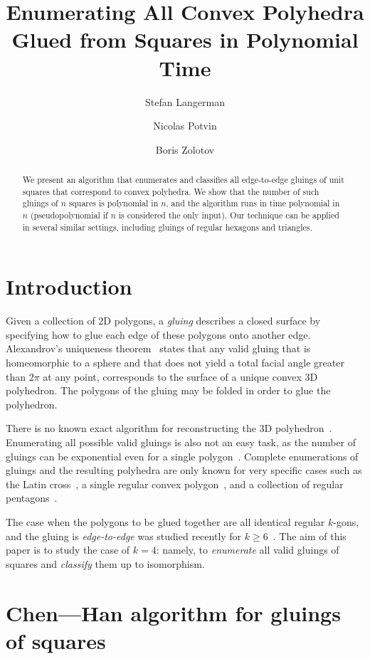 \documentclass[a4paper,USenglish,cleveref, autoref, thm-restate]{socg-lipics-v2019}
\title{Enumerating All Convex Polyhedra Glued from Squares in Polynomial Time}
\author{Stefan Langerman}{Faculté des Sciences, Université Libre de Bruxelles}{stefan.langerman@ulb.ac.be}{ }{is Directeur de recherches du F.R.S.-FNRS}
\author{Nicolas Potvin}{Faculté des Sciences, Université Libre de Bruxelles}{potvinnicolas2@gmail.com}{ }{}
\author{Boris Zolotov}{Department of Mathematics and Computer Sciences, St. Petersburg State University}{boris.a.zolotov@yandex.com}{ }{is supported in part by the Foundation for the Advancement of Theoretical Physics and Mathematics ``BASIS'' and in part by ``Native towns'', a social investment program of PJSC ``Gazprom Neft''.}
\begin{document}
\maketitle

\begin{abstract}We present an algorithm that enumerates and classifies all edge-to-edge gluings of unit squares that correspond to convex polyhedra. We show that the number of such gluings of $n$ squares is polynomial in $n$, and the algorithm runs in time polynomial in $n$ (pseudopolynomial if $n$ is considered the only input). Our technique can be applied in several similar settings, including gluings of regular hexagons and triangles.\end{abstract}

\section{Introduction}

Given a collection of 2D polygons, a \emph{gluing} describes a closed surface by specifying how to glue each edge of these polygons onto another edge. Alexandrov's uniqueness theorem~\cite{alex} states that any valid gluing that is homeomorphic to a sphere and that does not yield a total facial angle greater than $2\pi$ at any point, corresponds to the surface of a unique convex 3D polyhedron. The polygons of the gluing may be folded in order to glue the polyhedron.

There is no known exact algorithm for reconstructing the 3D polyhedron~\cite{bannister2014galois,kpd09-approx}. Enumerating all possible valid gluings is also not an easy task, as the number of gluings can be exponential even for a single polygon~\cite{DDLO02}. Complete enumerations of gluings and the resulting polyhedra are only known for very specific cases such as the Latin cross~\cite{ddlop99}, a single regular convex polygon~\cite{DO07}, and a collection of regular pentagons~\cite{alz-penta}.

The case when the polygons to be glued together are all identical regular $k$-gons, and the gluing is \emph{edge-to-edge} was studied recently for $k \ge 6$~\cite{kl17-hex}. The aim of this paper is to study the case of $k=4$: namely, to {\it enumerate} all valid gluings of squares and {\it classify} them up to isomorphism.

\section{Chen—Han algorithm for gluings of squares}
\end{document}
